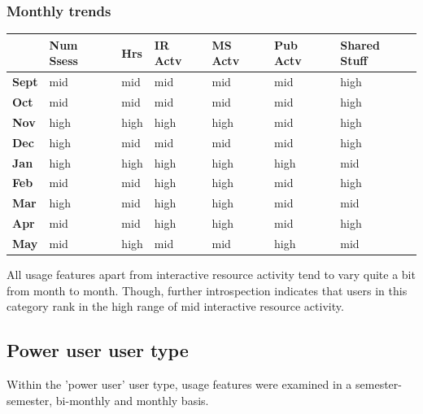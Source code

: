 \documentclass{acm_proc_article-sp}
\begin{document}
\subsubsection{Monthly trends}
\begin{table}
\begin{tabular}{|p{1.5cm}|p{0.6cm}|p{0.6cm}|p{0.6cm}|p{0.6cm}|p{0.8cm}|p{0.8cm}|}
 & Num Ssess & Hrs & IR Actv & MS Actv & Pub Actv & Shared Stuff \\ \hline
\textbf{Sept} & mid                                    & mid   & mid         & mid             & mid            & high                \\
\textbf{Oct}   & mid                                    & mid   & mid         & mid             & mid            & high                \\
\textbf{Nov}  & high                                   & high  & high        & high            & mid            & high                \\
\textbf{Dec}  & high                                   & mid   & mid         & mid             & mid            & high                \\
\textbf{Jan}   & high                                   & high  & high        & high            & high           & mid                 \\
\textbf{Feb}  & mid                                    & mid   & high        & high            & mid            & high                \\
\textbf{Mar}     & high                                   & mid   & high        & high            & mid            & mid                 \\
\textbf{Apr}     & mid                                    & mid   & high        & high            & mid            & high                \\
\textbf{May}       & mid                                    & high  & mid         & mid             & high           & mid                
\end{tabular}
\end{table}
All usage features apart from interactive resource activity tend to vary quite a bit from month to month. Though, further introspection indicates that users in this category rank in the high range of mid interactive resource activity.

\subsection {Power user user type}
Within the 'power user' user type, usage features were examined in a semester-semester, bi-monthly and monthly basis.
\end{document}
